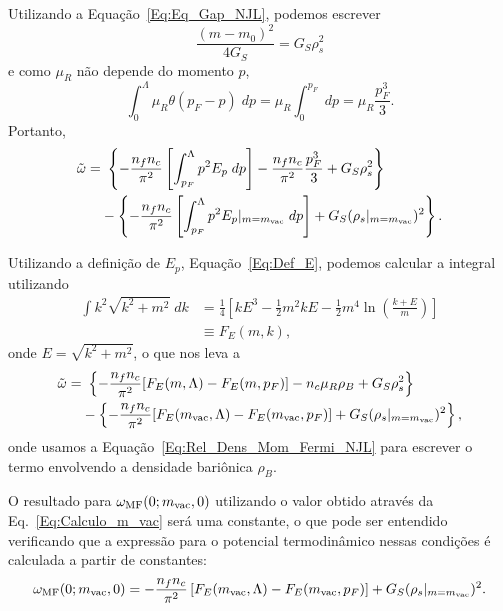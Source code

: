 %
Utilizando a Equação~\eqref{Eq:Eq_Gap_NJL}, podemos escrever
\begin{equation}
	\frac{(m - m_0)^2}{4G_S} = G_S \rho_s^2
\end{equation}
%
e como $\mu_R$ não depende do momento $p$,
\begin{equation}
	\int_0^\Lambda \mu_R \theta(p_F - p) \; dp = \mu_R \int_{0}^{p_F} \; dp = \mu_R\frac{p_F^3}{3}.
\end{equation}
%
Portanto,
\begin{equation}
\begin{split}
\tilde{\omega} =&~ \left\{- \frac{n_f n_c}{\pi^2} \left[\int_{p_F}^\Lambda p^2E_p \; dp \right] - \frac{n_f n_c}{\pi^2} \frac{p_F^3}{3} + G_S\rho_s^2\right\} \\
&-\left\{- \frac{n_f n_c}{\pi^2} \left[\int_{p_F}^\Lambda p^2 E_p|_{m=m_{\rm{vac}}} \; dp \right] + G_S(\rho_s|_{m = m_{\rm{vac}}})^2\right\}.
\end{split}
\end{equation}

Utilizando a definição de $E_p$, Equação~\eqref{Eq:Def_E}, podemos calcular a integral utilizando
\begin{align}
	\int k^2 \sqrt{k^2 + m^2} \;dk &= \frac{1}{4}\left[k E^3 - \frac{1}{2} m^2 k E - \frac{1}{2} m^4\ln\left(\frac{k+E}{m}\right)\right] \\
	&\equiv F_E(m, k),
\end{align}
%
onde $E = \sqrt{k^2 + m^2}$, o que nos leva a
\begin{equation}\label{Eq:Pot_termodinamico_1}
\begin{split}
\tilde{\omega} =&~ \left\{- \frac{n_f n_c}{\pi^2} [F_E(m,\Lambda) - F_E(m, p_F)] - n_c\mu_R \rho_B + G_S\rho_s^2\right\} \\
&-\left\{- \frac{n_f n_c}{\pi^2} [F_E(m_{\rm{vac}}, \Lambda) - F_E(m_{\rm{vac}}, p_F)] + G_S(\rho_s|_{m = m_{\rm{vac}}})^2\right\},
\end{split}
\end{equation}
%
onde usamos a Equação~\eqref{Eq:Rel_Dens_Mom_Fermi_NJL} para escrever o termo envolvendo a densidade bariônica $\rho_B$.

O resultado  para $\omega_{\rm{MF}}(0;m_{\rm{vac}},0)$ utilizando o valor obtido através da Eq.~\eqref{Eq:Calculo_m_vac} será uma constante, o que pode ser entendido verificando que a expressão para o potencial termodinâmico nessas condições é calculada a partir de constantes:
\begin{equation}
	\omega_{\rm{MF}}(0;m_{\rm{vac}},0) = -\frac{n_f n_c}{\pi^2}\left[F_E(m_{\rm{vac}}, \Lambda) - F_E(m_{\rm{vac}}, p_F)\right] + G_S(\rho_s|_{m=m_{\rm{vac}}})^2.
\end{equation}

